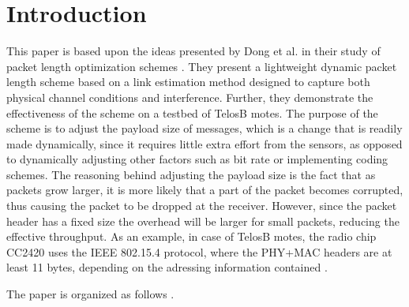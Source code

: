 \section{Introduction}
This paper is based upon the ideas presented by Dong et al. in their study of packet length optimization schemes \cite{DPLCpaper}. They present a lightweight dynamic packet length scheme based on a link estimation method designed to capture both physical channel conditions and interference. Further, they demonstrate the effectiveness of the scheme on a testbed of TelosB motes. The purpose of the scheme is to adjust the payload size of messages, which is a change that is readily made dynamically, since it requires little extra effort from the sensors, as opposed to dynamically adjusting other factors such as bit rate or implementing coding schemes. The reasoning behind adjusting the payload size is the fact that as packets grow larger, it is more likely that a part of the packet becomes corrupted, thus causing the packet to be dropped at the receiver. However, since the packet header has a fixed size the overhead will be larger for small packets, reducing the effective throughput. As an example, in case of TelosB motes, the radio chip CC2420 uses the IEEE 802.15.4 protocol, where the PHY+MAC headers are at least 11 bytes, depending on the adressing information contained \cite{CC2420}.

The paper is organized as follows .
